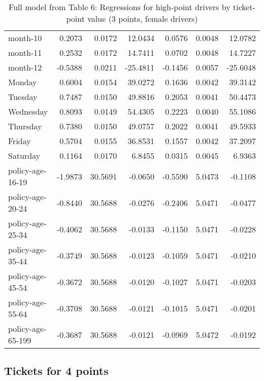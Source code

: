 \documentclass[10pt]{article}
\begin{document}
\begin{table}[ht]
\begin{tabular}{lrrrrrr}
  month-10 & 0.2073 & 0.0172 & 12.0434 & 0.0576 & 0.0048 & 12.0782 \\ 
  month-11 & 0.2532 & 0.0172 & 14.7411 & 0.0702 & 0.0048 & 14.7227 \\ 
  month-12 & -0.5388 & 0.0211 & -25.4811 & -0.1456 & 0.0057 & -25.6048 \\ 
  Monday & 0.6004 & 0.0154 & 39.0272 & 0.1636 & 0.0042 & 39.3142 \\ 
  Tuesday & 0.7487 & 0.0150 & 49.8816 & 0.2053 & 0.0041 & 50.4473 \\ 
  Wednesday & 0.8093 & 0.0149 & 54.4305 & 0.2223 & 0.0040 & 55.1086 \\ 
  Thursday & 0.7380 & 0.0150 & 49.0757 & 0.2022 & 0.0041 & 49.5933 \\ 
  Friday & 0.5704 & 0.0155 & 36.8531 & 0.1557 & 0.0042 & 37.2097 \\ 
  Saturday & 0.1164 & 0.0170 & 6.8455 & 0.0315 & 0.0045 & 6.9363 \\ 
  policy-age-16-19 & -1.9873 & 30.5691 & -0.0650 & -0.5590 & 5.0473 & -0.1108 \\ 
  policy-age-20-24 & -0.8440 & 30.5688 & -0.0276 & -0.2406 & 5.0471 & -0.0477 \\ 
  policy-age-25-34 & -0.4062 & 30.5688 & -0.0133 & -0.1150 & 5.0471 & -0.0228 \\ 
  policy-age-35-44 & -0.3749 & 30.5688 & -0.0123 & -0.1059 & 5.0471 & -0.0210 \\ 
  policy-age-45-54 & -0.3672 & 30.5688 & -0.0120 & -0.1027 & 5.0471 & -0.0203 \\ 
  policy-age-55-64 & -0.3708 & 30.5688 & -0.0121 & -0.1015 & 5.0471 & -0.0201 \\ 
  policy-age-65-199 & -0.3687 & 30.5688 & -0.0121 & -0.0969 & 5.0472 & -0.0192 \\ 
   \hline
\end{tabular}
\caption{Full model from Table 6: Regressions for high-point drivers by ticket-point value (3 points, female drivers)} 
\label{tab_6_3_pts_F}
\end{table}


\clearpage
\pagebreak




\subsection{Tickets for 4 points}
\end{document}
